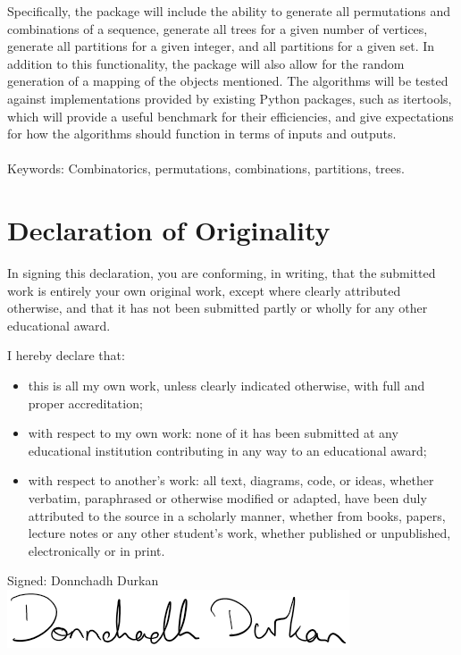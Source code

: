\documentclass[12pt]{article}
\begin{document}
Specifically, the package will include the ability to generate all permutations and combinations of a
sequence, generate all trees for a given number of vertices, generate all partitions for a given
integer, and all partitions for a given set. In addition to this functionality, the package will also allow for the random generation of a mapping of the objects mentioned. The algorithms will be tested
against implementations provided by existing Python packages, such as itertools, which will provide
a useful benchmark for their efficiencies, and give expectations for how the algorithms should
function in terms of inputs and outputs.
\\\\
Keywords: Combinatorics, permutations, combinations, partitions, trees.
\vspace*{\fill}
\pagebreak

\section*{Declaration of Originality}
\vspace*{7em}
In signing this declaration, you are conforming, in writing, that the submitted work is entirely your own original work, except where clearly attributed otherwise, and that it has not been submitted partly or wholly for any other educational award.

I hereby declare that:
\begin{itemize}
    \item this is all my own work, unless clearly indicated otherwise, with full
and proper accreditation;
    \item with respect to my own work: none of it has been submitted at any educational institution contributing in any way to an educational award;
    \item with respect to another’s work: all text, diagrams, code, or ideas,
    whether verbatim, paraphrased or otherwise modified or adapted, have
    been duly attributed to the source in a scholarly manner, whether
    from books, papers, lecture notes or any other student’s work, whether
    published or unpublished, electronically or in print.
\end{itemize}

Signed: Donnchadh Durkan \includegraphics[width=0.5\linewidth]{images/signature.PNG}
\end{document}
